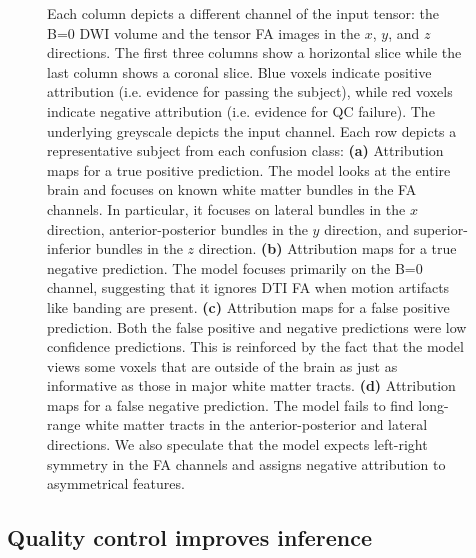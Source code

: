 \documentclass[fleqn,10pt]{wlscirep}
\begin{document}
\begin{figure}[tbp]
{        Each column depicts a different channel of the input tensor: the B=0 DWI volume and
        the tensor FA images in the $x$, $y$, and $z$ directions. The first three columns
        show a horizontal slice while the last column shows a coronal slice. Blue voxels
        indicate positive attribution (i.e. evidence for passing the subject),
        while red voxels indicate negative attribution (i.e. evidence for QC
        failure). The underlying greyscale depicts the input channel. Each row
        depicts a representative subject from each confusion class:
        \textbf{(a)} Attribution maps for a true positive prediction. The model
        looks at the entire brain and focuses on known white matter bundles in
        the FA channels. In particular, it focuses on lateral bundles in the
        $x$ direction, anterior-posterior bundles in the $y$ direction, and
        superior-inferior bundles in the $z$ direction.
        \textbf{(b)} Attribution maps for a true negative prediction. The model
        focuses primarily on the B=0 channel, suggesting that it ignores DTI FA
        when motion artifacts like banding are present.
        \textbf{(c)} Attribution maps for a false positive prediction. Both the
        false positive and negative predictions were low confidence predictions.
        This is reinforced by the fact that the model views some voxels that are
        outside of the brain as just as informative as those in major white
        matter tracts.
        \textbf{(d)} Attribution maps for a false negative prediction. The model
        fails to find long-range white matter tracts in the anterior-posterior
        and lateral directions. We also speculate that the model expects
        left-right symmetry in the FA channels and assigns negative attribution
        to asymmetrical features.
    }
    \label{fig:ig}
\end{figure}

\subsection*{Quality control improves inference}
\end{document}
